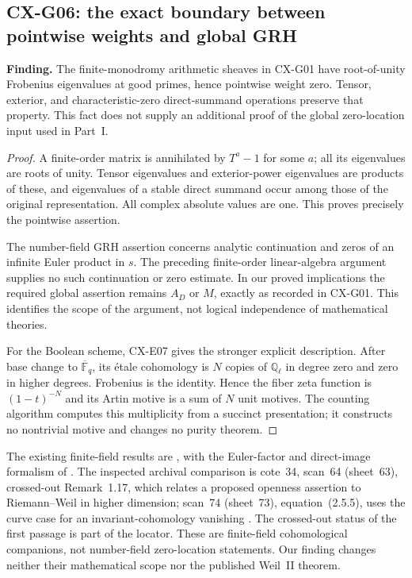 \subsection{CX-G06: the exact boundary between pointwise weights and global GRH}
\label{finding:CX-G06}

\textbf{Finding.} The finite-monodromy arithmetic sheaves in CX-G01 have
root-of-unity Frobenius eigenvalues at good primes, hence pointwise weight
zero.  Tensor, exterior, and characteristic-zero direct-summand operations
preserve that property.  This fact does not supply an additional proof of
the global zero-location input used in Part~I.

\begin{proof}
A finite-order matrix is annihilated by $T^a-1$ for some $a$; all its
eigenvalues are roots of unity.  Tensor eigenvalues and exterior-power
eigenvalues are products of these, and eigenvalues of a stable direct
summand occur among those of the original representation.  All complex
absolute values are one.  This proves precisely the pointwise assertion.

The number-field GRH assertion concerns analytic continuation and zeros of
an infinite Euler product in $s$.  The preceding finite-order linear-algebra
argument supplies no such continuation or zero estimate.  In our proved
implications the required global assertion remains $A_D$ or $M$, exactly
as recorded in CX-G01.  This identifies the scope of the argument, not
logical independence of mathematical theories.

For the Boolean scheme, CX-E07 gives the stronger explicit description.
After base change to $\overline{\mathbb F}_q$, its étale cohomology is $N$
copies of $\mathbb Q_\ell$ in degree zero and zero in higher degrees.
Frobenius is the identity.  Hence the fiber zeta function is $(1-t)^{-N}$
and its Artin motive is a sum of $N$ unit motives.  The counting algorithm
computes this multiplicity from a succinct presentation; it constructs
no nontrivial motive and changes no purity theorem.
\end{proof}

The existing finite-field results are
\cite[\S1.2; Theorem~3.3.1, p.~204; Corollary~3.3.9, p.~207]{WeilII},
with the Euler-factor and direct-image formalism of
\cite[Exp.~XV \S3, no.~1 Proposition~1, and no.~2]{SGA5}.
The inspected archival comparison is cote~34, scan~64 (sheet~63),
crossed-out Remark~1.17, which relates a proposed openness assertion to
Riemann--Weil in higher dimension; scan~74 (sheet~73), equation~(2.5.5),
uses the curve case for an invariant-cohomology vanishing
\cite{Archive34}.  The crossed-out status of the first passage is part
of the locator.  These are finite-field cohomological companions, not
number-field zero-location statements.  Our finding changes neither
their mathematical scope nor the published Weil~II theorem.

